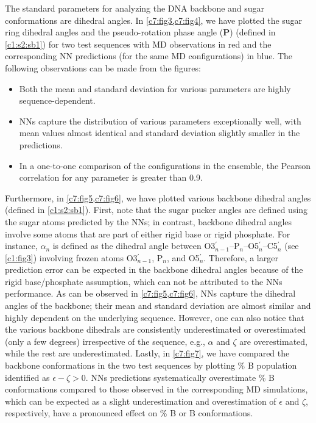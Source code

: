 The standard parameters for analyzing the DNA backbone and sugar conformations are dihedral angles.
In \cref{c7:fig3,c7:fig4}, we have plotted the sugar ring dihedral angles and the pseudo-rotation phase angle (\textbf{\textsc{P}}) (defined in \cref{c1:s2:sb1}) for two test sequences with MD observations in red and the corresponding NN predictions (for the same MD configurations) in blue.
The following observations can be made from the figures:
\begin{itemize}
\item Both the mean and standard deviation for various parameters are highly sequence-dependent.
\item NNs capture the distribution of various parameters exceptionally well, with mean values almost identical and standard deviation slightly smaller in the predictions.
\item In a one-to-one comparison of the configurations in the ensemble, the Pearson correlation for any parameter is greater than 0.9.
\end{itemize}

Furthermore, in \cref{c7:fig5,c7:fig6}, we have plotted various backbone dihedral angles (defined in \cref{c1:s2:sb1}). 
First, note that the sugar pucker angles are defined using the sugar atoms predicted by the NNs; in contrast, backbone dihedral angles involve some atoms that are part of either rigid base or rigid phosphate.
For instance, $\alpha_n$ is defined as the dihedral angle between O3$^\prime_{n-1}$--P$_{n}$--O5$^\prime_{n}$--C5$^\prime_{n}$ (see \cref{c1:fig3}) involving frozen atoms O3$^\prime_{n-1}$, P$_{n}$, and O5$^\prime_{n}$.
Therefore, a larger prediction error can be expected in the backbone dihedral angles because of the rigid base/phosphate assumption, which can not be attributed to the NNs performance.
As can be observed in \cref{c7:fig5,c7:fig6}, NNs capture the dihedral angles of the backbone; their mean and standard deviation are almost similar and highly dependent on the underlying sequence.
However, one can also notice that the various backbone dihedrals are consistently underestimated or overestimated (only a few degrees) irrespective of the sequence, e.g., $\alpha$ and $\zeta$ are overestimated, while the rest are underestimated.
Lastly, in \cref{c7:fig7}, we have compared the backbone conformations in the two test sequences by plotting \% B population identified as $\epsilon - \zeta > 0$. 
NNs predictions systematically overestimate \% B conformations compared to those observed in the corresponding MD simulations, which can be expected as a slight underestimation and overestimation of $\epsilon$ and $\zeta$, respectively, have a pronounced effect on \% B or B conformations.

